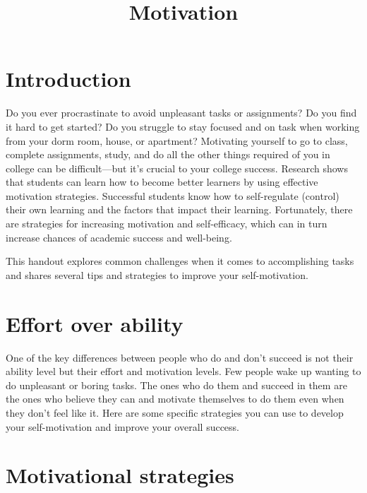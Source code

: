 \documentclass[../main.tex]{subfiles}
\title{Motivation}
\begin{document}
\maketitle
%
\section{Introduction}
Do you ever procrastinate to avoid unpleasant tasks or assignments? Do you find
it hard to get started? Do you struggle to stay focused and on task when working
from your dorm room, house, or apartment? Motivating yourself to go to class,
complete assignments, study, and do all the other things required of you in
college can be difficult---but it’s crucial to your college success. Research
shows that students can learn how to become better learners by using effective
motivation strategies. Successful students know how to self-regulate (control)
their own learning and the factors that impact their learning. Fortunately,
there are strategies for increasing motivation and self-efficacy, which can in
turn increase chances of academic success and well-being.

This handout explores common challenges when it comes to accomplishing tasks and
shares several tips and strategies to improve your self-motivation.
%
\section{Effort over ability}
One of the key differences between people who do and don’t succeed is not their
ability level but their effort and motivation levels. Few people wake up wanting
to do unpleasant or boring tasks. The ones who do them and succeed in them are
the ones who believe they can and motivate themselves to do them even when they
don’t feel like it. Here are some specific strategies you can use to develop
your self-motivation and improve your overall success.
%
\section{Motivational strategies}
\end{document}
